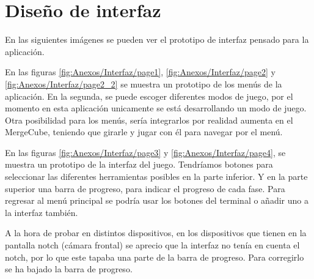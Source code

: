 



\section{Diseño de interfaz}

En las siguientes imágenes se pueden ver el prototipo de interfaz pensado para la aplicación. 

En las figuras \ref{fig:Anexos/Interfaz/page1}, \ref{fig:Anexos/Interfaz/page2} y \ref{fig:Anexos/Interfaz/page2_2} se muestra un prototipo de los menús de la aplicación. En la segunda, se puede escoger diferentes modos de juego, por el momento en esta aplicación unicamente se está desarrollando un modo de juego. 
Otra posibilidad para los menús, sería integrarlos por realidad aumenta en el MergeCube, teniendo que girarle y jugar con él para navegar por el menú.

En las figuras \ref{fig:Anexos/Interfaz/page3} y \ref{fig:Anexos/Interfaz/page4}, se muestra un prototipo de la interfaz del juego. Tendríamos botones para seleccionar las diferentes herramientas posibles en la parte inferior. Y en la parte superior una barra de progreso, para indicar el progreso de cada fase. Para regresar al menú principal se podría usar los botones del terminal o añadir uno a la interfaz también.




A la hora de probar en distintos dispositivos, en los dispositivos que tienen en la pantalla notch (cámara frontal) se aprecio que la interfaz no tenía en cuenta el notch, por lo que este tapaba una parte de la barra de progreso. Para corregirlo se ha bajado la barra de progreso.

